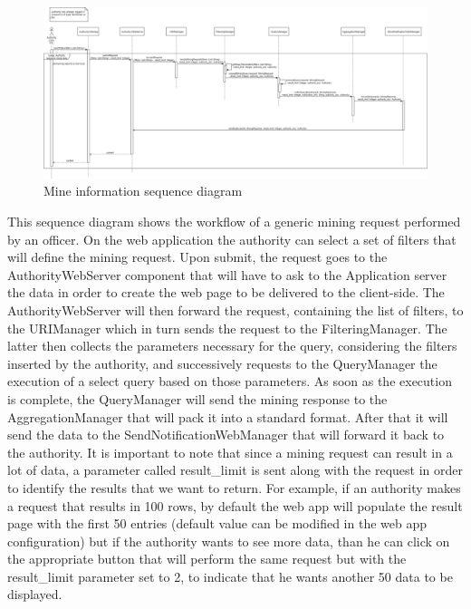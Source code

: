 \begin{figure}[H]
  \centering
  \includegraphics[width=1\textwidth]{Images/UML_diagrams/Sequence_Diagrams/Mine_information_sd.png}
  \caption{Mine information sequence diagram}
  \label{fig:mine_info_sd}
\end{figure}
This sequence diagram shows the workflow of a generic mining request performed by an officer. On the web application the authority can select a set of filters that will define the mining request. Upon submit, the request goes to the AuthorityWebServer component that will have to ask to the Application server the data in order to create the web page to be delivered to the client-side. The AuthorityWebServer will then forward the request, containing the list of filters, to the URIManager which in turn sends the request to the FilteringManager. The latter then collects the parameters necessary for the query, considering the filters inserted by the authority, and successively requests to the QueryManager the execution of a select query based on those parameters. As soon as the execution is complete, the QueryManager will send the mining response to the AggregationManager that will pack it into a standard format. After that it will send the data to the SendNotificationWebManager that will forward it back to the authority. It is important to note that since a mining request can result in a lot of data, a parameter called result\_limit is sent along with the request in order to identify the results that we want to return. For example, if an authority makes a request that results in 100 rows, by default the web app will populate the result page with the first 50 entries (default value can be modified in the web app configuration) but if the authority wants to see more data, than he can click on the appropriate button that will perform the same request but with the result\_limit parameter set to 2, to indicate that he wants another 50 data to be displayed. 
